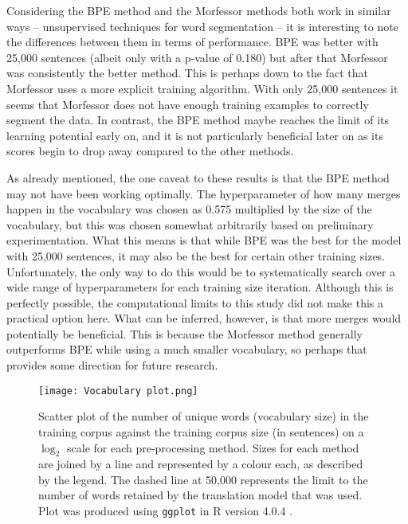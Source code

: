 \documentclass[11pt]{article}
\begin{document}
\bigskip

Considering the BPE method and the Morfessor methods both work in similar ways -- unsupervised techniques for word segmentation -- it is interesting to note the differences between them in terms of performance. BPE was better with 25,000 sentences (albeit only with a p-value of 0.180) but after that Morfessor was consistently the better method. This is perhaps down to the fact that Morfessor uses a more explicit training algorithm. With only 25,000 sentences it seems that Morfessor does not have enough training examples to correctly segment the data. In contrast, the BPE method maybe reaches the limit of its learning potential early on, and it is not particularly beneficial later on as its scores begin to drop away compared to the other methods.

\bigskip

As already mentioned, the one caveat to these results is that the BPE method may not have been working optimally. The hyperparameter of how many merges happen in the vocabulary was chosen as 0.575 multiplied by the size of the vocabulary, but this was chosen somewhat arbitrarily based on preliminary experimentation. What this means is that while BPE was the best for the model with 25,000 sentences, it may also be the best for certain other training sizes. Unfortunately, the only way to do this would be to systematically search over a wide range of hyperparameters for each training size iteration. Although this is perfectly possible, the computational limits to this study did not make this a practical option here. What can be inferred, however, is that more merges would potentially be beneficial. This is because the Morfessor method generally outperforms BPE while using a much smaller vocabulary, so perhaps that provides some direction for future research.

\bigskip

\begin{figure}[h]
    \centering
    \texttt{[image: Vocabulary plot.png]}
    \caption{Scatter plot of the number of unique words (vocabulary size) in the training corpus against the training corpus size (in sentences) on a $\log_2$ scale for each pre-processing method. Sizes for each method are joined by a line and represented by a colour each, as described by the legend. The dashed line at 50,000 represents the limit to the number of words retained by the translation model that was used. Plot was produced using \texttt{ggplot} \citep{ggplot} in R version 4.0.4 \citep{R}.}
    \label{fig:vocab}
\end{figure}
\end{document}
